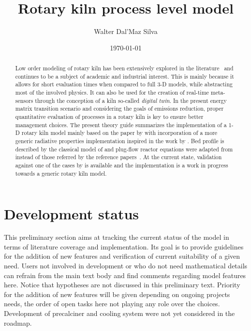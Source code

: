 \documentclass[11pt]{paper}
\title{Rotary kiln process level model}
\author{Walter Dal'Maz Silva}
\date{\today}
\begin{document}
\maketitle%

\begin{abstract}
Low order modeling of rotary kiln has been extensively explored in the literature~\cite{Boateng1996,Mujumdar2006i,Mujumdar2006ii,Fan2013,Csernyei2016,Hanein2017,Shcherbina2019} and continues to be a subject of academic and industrial interest. This is mainly because it allows for short evaluation times when compared to full 3-D models, while abstracting most of the involved physics. It can also be used for the creation of real-time meta-sensors through the conception of a kiln so-called \emph{digital twin}. In the present energy matrix transition scenario and considering the goals of  emissions reduction, proper quantitative evaluation of processes in a rotary kiln is key to ensure better management choices. The present theory guide summarizes the implementation of a 1-D rotary kiln model mainly based on the paper by \textcite{Hanein2017} with incorporation of a more generic radiative properties implementation inspired in the work by \textcite{Yuen2009}. Bed profile is described by the classical model of \textcite{Kramers1952} and plug-flow reactor equations were adapted from \textcite{Kee2017} instead of those referred by the reference papers~\cite{Mujumdar2006i,Hanein2017}. At the current state, validation against one of the cases by \textcite{Barr1986PhD} is available and the implementation is a work in progress towards a generic rotary kiln model.
\end{abstract}

\section*{Development status}

This preliminary section aims at tracking the current status of the model in terms of literature coverage and implementation. Its goal is to provide guidelines for the addition of new features and verification of current suitability of a given need. Users not involved in development or who do not need mathematical details can refrain from the main text body and find comments regarding model features here. Notice that hypotheses are not discussed in this preliminary text. Priority for the addition of new features will be given depending on ongoing projects needs, the order of open tasks here not playing any role over the choices. Development of precalciner and cooling system were not yet considered in the roadmap.
\end{document}
